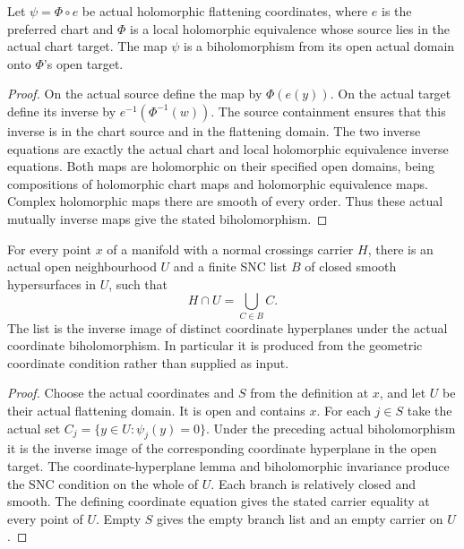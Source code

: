 \begin{lemma}
\label{hir:actual-flat-domain-biholomorphism}
\leanok
Let $\psi=\Phi\circ e$ be actual holomorphic flattening coordinates,
where $e$ is the preferred chart and $\Phi$ is a local holomorphic
equivalence whose source lies in the actual chart target.  The map
$\psi$ is a biholomorphism from its open actual domain onto
$\Phi$'s open target.
\end{lemma}
\begin{proof}
On the actual source define the map by $\Phi(e(y))$.  On the actual
target define its inverse by $e^{-1}(\Phi^{-1}(w))$.
The source containment ensures that this inverse is in the chart source
and in the flattening domain.  The two inverse equations are exactly
the actual chart and local holomorphic equivalence inverse equations.
Both maps are holomorphic on their specified open domains, being
compositions of holomorphic chart maps and holomorphic equivalence
maps.  Complex holomorphic maps there are smooth of every order.
Thus these actual mutually inverse maps give the stated biholomorphism.
\end{proof}

\begin{theorem}
\label{hir:general-nc-actual-local-snc-branches}
\leanok
For every point $x$ of a manifold with a normal crossings carrier $H$,
there is an actual open neighbourhood $U$ and a finite SNC list $B$
of closed smooth hypersurfaces in $U$, such that
\[
 H\cap U=\bigcup_{C\in B}C.
\]
The list is the inverse image of distinct coordinate hyperplanes under
the actual coordinate biholomorphism.  In particular it is produced
from the geometric coordinate condition rather than supplied as input.
\end{theorem}
\begin{proof}
Choose the actual coordinates and $S$ from the definition at $x$,
and let $U$ be their actual flattening domain.  It is open and contains
$x$.  For each $j\in S$ take the actual set
$C_j=\{y\in U:\psi_j(y)=0\}$.
Under the preceding actual biholomorphism it is the inverse image of
the corresponding coordinate hyperplane in the open target.
The coordinate-hyperplane lemma and biholomorphic invariance produce
the SNC condition on the whole of $U$.  Each branch is relatively
closed and smooth.  The defining coordinate equation gives the stated
carrier equality at every point of $U$.  Empty $S$ gives the empty
branch list and an empty carrier on $U$.
\end{proof}

